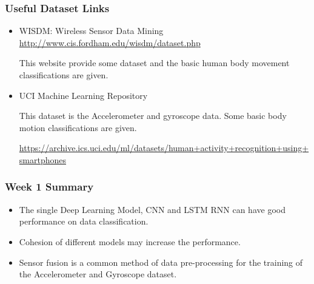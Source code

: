 \documentclass{beamer} %
\begin{document}
\begin{frame}
\frametitle{Useful Dataset Links}

\begin{itemize}
\item WISDM: Wireless Sensor Data Mining
\url{http://www.cis.fordham.edu/wisdm/dataset.php}

This website provide some dataset and the basic human body movement classifications are given. 

\item UCI Machine Learning Repository

This dataset is the Accelerometer and gyroscope data. Some basic body motion classifications are given. 

\url{https://archive.ics.uci.edu/ml/datasets/human+activity+recognition+using+smartphones}

\end{itemize}
\end{frame}

\begin{frame}
\frametitle{Week 1 Summary}

\begin{itemize}
\item The single Deep Learning Model, CNN and LSTM RNN can have good performance on data classification.

\item Cohesion of different models may increase the performance.

\item Sensor fusion is a common method of data pre-processing for the training of the Accelerometer and Gyroscope dataset. 
\end{itemize}

\end{frame}
\end{document}
